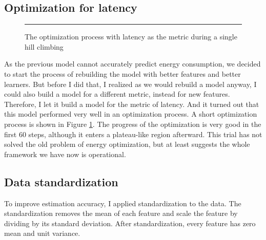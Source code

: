 \documentclass[12pt]{article}
\theoremstyle{definition}
\begin{document}
\subsection{Optimization for latency}
\begin{figure}[htb]
    \centering
    \begin{subfigure}
      {\texttt{[image: trace.png]}}
    \end{subfigure}
    \rule{\linewidth}{1pt}
    \caption{The optimization process with latency as the metric during a single hill climbing}
    \label{fig:latency}
\end{figure}
As the previous model cannot accurately predict energy consumption, we decided to start the process of rebuilding the model with better features and better learners. But before I did that, I realized as we would rebuild a model anyway, I could also build a model for a different metric, instead for new features. Therefore, I let it build a model for the metric of latency. And it turned out that this model performed very well in an optimization process. A short optimization process is shown in Figure \ref{fig:latency}. The progress of the optimization is very good in the first 60 steps, although it enters a plateau-like region afterward. This trial has not solved the old problem of energy optimization, but at least suggests the whole framework we have now is operational.
\subsection{Data standardization}
To improve estimation accuracy, I applied standardization to the data. The standardization removes the mean of each feature and scale the feature by dividing by its standard deviation. After standardization, every feature has zero mean and unit variance.
\end{document}
